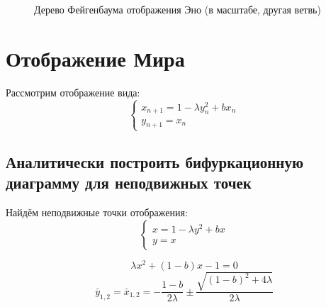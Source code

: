 \documentclass[12pt, a4paper]{article}
\begin{document}
\begin{figure}[H]
	\caption{Дерево Фейгенбаума отображения Эно (в масштабе, другая ветвь)}
\end{figure}

\section{Отображение Мира}
Рассмотрим отображение вида:
\begin{equation*}
	\begin{cases}
		x_{n + 1} = 1 - \lambda y^2_n + b x_n \\
		y_{n + 1} = x_n
	\end{cases}
\end{equation*}

\subsection{Аналитически построить бифуркационную диаграмму для неподвижных точек}
Найдём неподвижные точки отображения:
\begin{equation*}
	\begin{cases}
		x = 1 - \lambda y^2 + b x \\
		y = x
	\end{cases}
\end{equation*}

\[ \lambda x^2 + (1 - b)x - 1 = 0 \]
\[ \bar y_{1,2} = \bar x_{1,2} = - \frac{1 - b}{2 \lambda} \pm \frac{\sqrt{(1 - b)^2 + 4 \lambda}}{2 \lambda} \]
\end{document}
